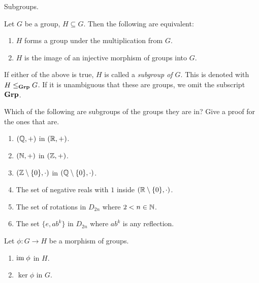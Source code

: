 \documentclass[../../book.tex]{subfiles}
\begin{document}
\begin{dfn} Subgroups. 

    Let $G$ be a group, $H \subseteq G$.
    Then the following are equivalent: 
    \begin{enumerate}
        \item $H$ forms a group under the multiplication from $G$. 
        \item $H$ is the image of an injective morphism of groups into $G$. 
    \end{enumerate}
    If either of the above is true, $H$ is called a \emph{subgroup of $G$}.
    This is denoted with $H \leq_{\mathbf{Grp}} G$. 
    If it is unambiguous that these are groups,
    we omit the subscript $\mathbf{Grp}$. 
    
\end{dfn}
\begin{ex}
    
    Which of the following are subgroups of the groups they are in? 
    Give a proof for the ones that are.
    \begin{enumerate}
        \item $(\mathbb{Q},+)$ in $(\mathbb{R},+)$.
        \item $(\mathbb{N},+)$ in $(\mathbb{Z},+)$.
        \item $(\mathbb{Z}\setminus\{0\},\cdot)$ in $(\mathbb{Q}\setminus\{0\},\cdot)$.
        \item The set of negative reals with $1$ inside $(\mathbb{R}\setminus\{0\},\cdot)$.
        \item The set of rotations in $D_{2n}$ where $2 < n \in \mathbb{N}$.
        \item The set $\{e,ab^k\}$ in $D_{2n}$ where $ab^k$ is any reflection.
    \end{enumerate}
    Let $\phi : G \to H$ be a morphism of groups.
    \begin{enumerate}[resume]
        \item $\textnormal{im}\; \phi$ in $H$.
        \item $\ker \phi$ in $G$.
    \end{enumerate}
    
\end{ex}
\end{document}

